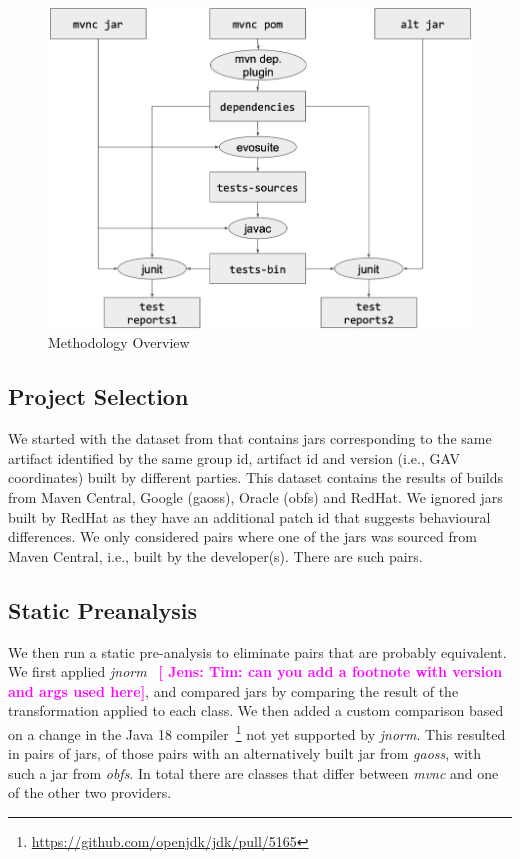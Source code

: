 \documentclass[conference]{IEEEtran}
\newcommand{\jens}[1]{\textbf{\textcolor{magenta}{[ \ding{46}Jens: #1]}}}
\newcommand{\inputgen}[1]{\unskip}
\begin{document}
\begin{figure}[ht!]
	\centering
	\includegraphics[width=\columnwidth]{methodology.jpg}
	\caption{Methodology Overview \label{fig:methodology}}
\end{figure}


\subsection{Project Selection}

We started with the dataset from \cite{dietrich2024levelsbinaryequivalencecomparison} that contains jars corresponding to the same artifact identified by the same group id, artifact id and version (i.e., GAV coordinates) built by different parties. This dataset contains the results of builds from Maven Central, Google (gaoss), Oracle (obfs) and  RedHat. We ignored jars built by RedHat as they have an additional patch id that suggests behavioural differences.  We only considered pairs where one of the jars was sourced from Maven Central, i.e., built by the developer(s). There are \inputgen{num-pairs-of-binaries} such pairs.


\subsection{Static Preanalysis}

We then run a static pre-analysis to eliminate pairs that are probably equivalent. We first applied \textit{jnorm}~\cite{schott2024JNorm} \jens{Tim: can you add a footnote with version and args used here}, and compared jars by comparing the result of the transformation applied to each class. We then added a custom comparison based on a change in the Java 18 compiler~\footnote{\url{https://github.com/openjdk/jdk/pull/5165}} not yet supported by \textit{jnorm}. This resulted in \inputgen{num-jar-pairs-after-invokevirtual-invokeinterface} pairs of jars, \inputgen{num-jar-pairs-after-invokevirtual-invokeinterface-gaoss} of those pairs with an alternatively built jar from \textit{gaoss}, \inputgen{num-jar-pairs-after-invokevirtual-invokeinterface-obfs} with such a jar from \textit{obfs}.
In total there are \inputgen{num-class-pairs-after-invokevirtual-invokeinterface} classes that differ between \textit{mvnc} and one of the other two providers.
\end{document}
